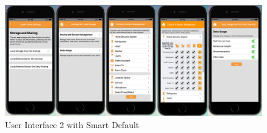 \begin{figure}
	\centering
	\includegraphics[width=\textwidth]{figures/ui2SD.png}
	\caption{User Interface 2 with Smart Default}
	\label{fig:ui2SD}
\end{figure}

